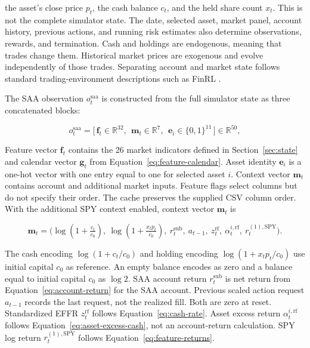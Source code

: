 the asset's close price $p_t$, the cash balance $c_t$, and the held share count $x_t$. This is not the complete simulator state. The date, selected asset, market panel, account history, previous actions, and running risk estimates also determine observations, rewards, and termination. Cash and holdings are endogenous, meaning that trades change them. Historical market prices are exogenous and evolve independently of those trades. Separating account and market state follows standard trading-environment descriptions such as FinRL \cite{liu2022finrldeepreinforcementlearning}.

The SAA observation \(o_t^{\mathrm{saa}}\) is constructed from the full simulator state as three concatenated blocks:


\begin{equation}
o_t^{\text{saa}} = \big[\, \mathbf{f}_t \in \mathbb{R}^{32},\ \ \mathbf{m}_t \in \mathbb{R}^{7},\ \ \mathbf{e}_i \in \{0,1\}^{11} \,\big]\in\mathbb{R}^{50},
\label{eq:saa-observation}
\end{equation}

Feature vector \(\mathbf f_t\) contains the 26 market indicators defined in Section~\ref{sec:state} and calendar vector \(\mathbf g_t\) from Equation~\eqref{eq:feature-calendar}. Asset identity \(\mathbf e_i\) is a one-hot vector with one entry equal to one for selected asset \(i\). Context vector \(\mathbf m_t\) contains account and additional market inputs. Feature flags select columns but do not specify their order. The cache preserves the supplied CSV column order. With the additional SPY context enabled, context vector \(\mathbf m_t\) is

\begin{equation}
\mathbf{m}_t = \Big(\log(1+\tfrac{c_t}{c_0}),\ \log(1+\tfrac{x_t p_t}{c_0}),\
r_t^{\text{sub}},\ a_{t-1},\ z_t^{\text{rf}},\ \alpha_t^{i,\text{rf}},\ r_t^{(1),\text{SPY}}\Big).
\label{eq:saa-context}
\end{equation}

The cash encoding \(\log(1+c_t/c_0)\) and holding encoding \(\log(1+x_tp_t/c_0)\) use initial capital \(c_0\) as reference. An empty balance encodes as zero and a balance equal to initial capital \(c_0\) as \(\log2\). SAA account return \(r_t^{\mathrm{sub}}\) is net return from Equation~\eqref{eq:account-return} for the SAA account. Previous scaled action request \(a_{t-1}\) records the last request, not the realized fill. Both are zero at reset. Standardized EFFR \(z_t^{\mathrm{rf}}\) follows Equation~\eqref{eq:cash-rate}. Asset excess return \(\alpha_t^{i,\mathrm{rf}}\) follows Equation~\eqref{eq:asset-excess-cash}, not an account-return calculation. SPY log return \(r_t^{(1),\mathrm{SPY}}\) follows Equation~\eqref{eq:feature-returns}.

